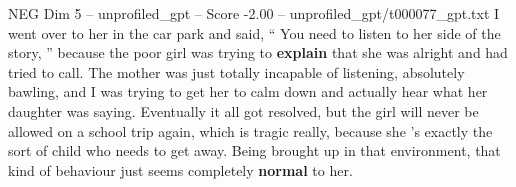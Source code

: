 \begin{textsample}{NEG Dim 5 – unprofiled\_gpt – Score -2.00 – unprofiled\_gpt/t000077\_gpt.txt}  \label{ex:f5_neg_004}
I went over to her in the car park and said, “ You need to listen to her side of the story, ” because the poor girl was trying to \textbf{explain} that she was alright and had tried to call.
The mother was just totally incapable of listening, absolutely bawling, and I was trying to get her to calm down and actually hear what her daughter was saying.
Eventually it all got resolved, but the girl will never be allowed on a school trip again, which is tragic really, because she ’s exactly the sort of child who needs to get away.
Being brought up in that environment, that kind of behaviour just seems completely \textbf{normal} to her.

\end{textsample}
